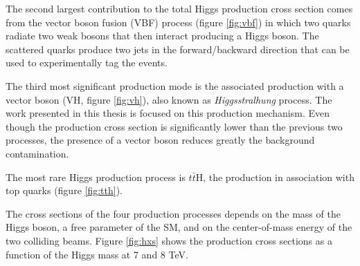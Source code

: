 The second largest contribution to the total Higgs production cross section comes from the vector boson fusion (VBF) process (figure \ref{fig:vbf}) in which two quarks radiate two weak bosons that then interact producing a Higgs boson. The scattered quarks produce two jets in the forward/backward direction that can be used to experimentally tag the events.

The third most significant production mode is the associated production with a vector boson (VH, figure \ref{fig:vh}), also known as \emph{Higgsstralhung} process. The work presented in this thesis is focused on this production mechanism. Even though the production cross section is significantly lower than the previous two processes, the presence of a vector boson reduces greatly the background contamination. %

The most rare Higgs production process is $t\bar{t}$H, the production in association with top quarks (figure \ref{fig:tth}).

The cross sections of the four production processes depends on the mass of the Higgs boson, a free parameter of the SM, and on the center-of-mass energy of the two colliding beams. Figure \ref{fig:hxs} shows the production cross sections as a function of the Higgs mass at 7 and 8 TeV.

